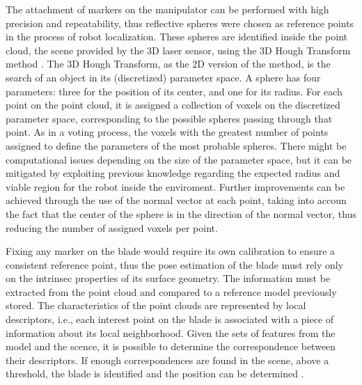 The attachment of markers on the manipulator can be performed with high
precision and repeatability, thus reflective spheres were chosen as reference
points in the process of robot localization. These spheres are identified inside
the point cloud, the scene provided by the 3D laser sensor, using the 3D Hough
Transform method \cite{camurri20143d}. The 3D Hough Transform, as the 2D version
of the method, is the search of an object in its (discretized) parameter space.
A sphere has four parameters: three for the position of its center, and one for its radius.
For each point on the point cloud, it is assigned a collection of voxels on the
discretized parameter space, corresponding to the possible spheres passing
through that point. As in a voting process, the voxels with the greatest number
of points assigned to define the parameters of the most probable spheres. There
might be computational issues depending on the size of the parameter space, but
it can be mitigated by exploiting previous knowledge regarding the expected
radius and viable region for the robot inside the enviroment. Further
improvements can be achieved through the use of the normal vector at each point,
taking into accoun the fact that the center of the sphere is in the direction of
the normal vector, thus reducing the number of assigned voxels per point.

Fixing any marker on the blade would require its own calibration to ensure a
consistent reference point, thus the pose estimation of the blade must rely only
on the intrinsec properties of its surface geometry. The information must be
extracted from the point cloud and compared to a reference model previously
stored. The characteristics of the point clouds are represented by local
descriptors, i.e., each interest point on the blade is associated with a piece
of information about its local neighborhood. Given the sets of features from the
model and the scence,  it is possible to determine the correspondence between
their descriptors. If enough correspondences are found in the scene, above a
threshold, the blade is identified and the position can be determined
\cite{Tombari2010a}.

